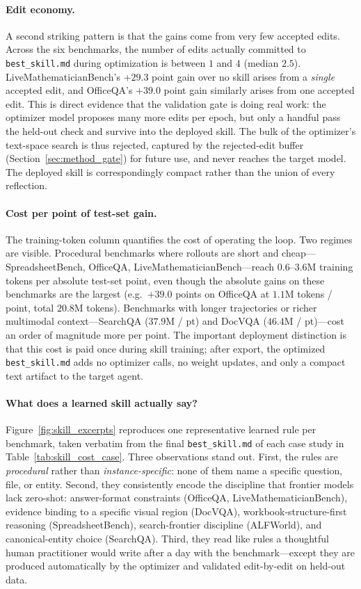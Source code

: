 \documentclass{llmxive}
\begin{document}
\paragraph{Edit economy.}
A second striking pattern is that the gains come from very few accepted edits. Across the six benchmarks, the number of edits actually committed to \texttt{best\_skill.md} during optimization is between $1$ and $4$ (median $2.5$). LiveMathematicianBench's $+29.3$ point gain over no skill arises from a \emph{single} accepted edit, and OfficeQA's $+39.0$ point gain similarly arises from one accepted edit. This is direct evidence that the validation gate is doing real work: the optimizer model proposes many more edits per epoch, but only a handful pass the held-out check and survive into the deployed skill. The bulk of the optimizer's text-space search is thus rejected, captured by the rejected-edit buffer (Section~\ref{sec:method_gate}) for future use, and never reaches the target model. The deployed skill is correspondingly compact rather than the union of every reflection.

\paragraph{Cost per point of test-set gain.}
The training-token column quantifies the cost of operating the loop. Two regimes are visible. Procedural benchmarks where rollouts are short and cheap---SpreadsheetBench, OfficeQA, LiveMathematicianBench---reach $0.6$--$3.6$M training tokens per absolute test-set point, even though the absolute gains on these benchmarks are the largest (e.g.\ $+39.0$ points on OfficeQA at $1.1$M tokens / point, total $20.8$M tokens). Benchmarks with longer trajectories or richer multimodal context---SearchQA ($37.9$M / pt) and DocVQA ($46.4$M / pt)---cost an order of magnitude more per point. The important deployment distinction is that this cost is paid once during skill training; after export, the optimized \texttt{best\_skill.md} adds no optimizer calls, no weight updates, and only a compact text artifact to the target agent.

\paragraph{What does a learned skill actually say?}
Figure~\ref{fig:skill_excerpts} reproduces one representative learned rule per benchmark, taken verbatim from the final \texttt{best\_skill.md} of each case study in Table~\ref{tab:skill_cost_case}. Three observations stand out. First, the rules are \emph{procedural} rather than \emph{instance-specific}: none of them name a specific question, file, or entity. Second, they consistently encode the discipline that frontier models lack zero-shot: answer-format constraints (OfficeQA, LiveMathematicianBench), evidence binding to a specific visual region (DocVQA), workbook-structure-first reasoning (SpreadsheetBench), search-frontier discipline (ALFWorld), and canonical-entity choice (SearchQA). Third, they read like rules a thoughtful human practitioner would write after a day with the benchmark---except they are produced automatically by the optimizer and validated edit-by-edit on held-out data.
\end{document}
